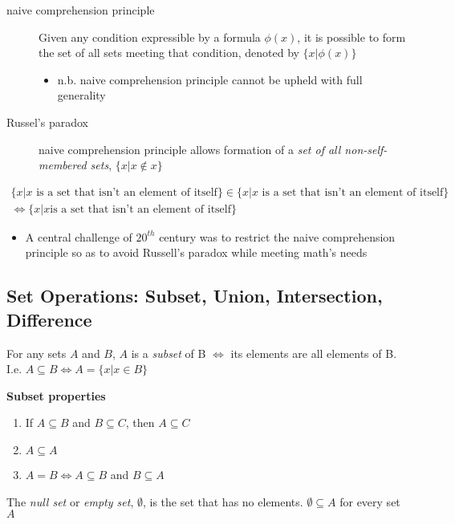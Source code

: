 \begin{description}
	\item[naive comprehension principle] Given any condition expressible by a
		formula $\phi(x)$, it is possible to form the set of all sets meeting
		that condition, denoted by $\{x| \phi(x)\}$
		\begin{itemize}
			\item n.b. naive comprehension principle cannot be upheld with full
			      generality
		\end{itemize}
	\item[Russel's paradox] naive comprehension principle allows formation
		of a \textit{set of all non-self-membered sets}, $\{x| x \not\in x\}$
\end{description}
\begin{align*}
	\{x| x \text{ is a set that isn't an element of itself}\} \in
	\{x| x \text{ is a set that isn't an element of itself}\} \\
	\iff \{x|
	x \text{
		is a set that isn't an element of itself}\}
\end{align*}
\begin{itemize}
	\item A central challenge of $20^{th}$ century was to restrict the naive
	      comprehension principle so as to avoid Russell's paradox while meeting
	      math's needs
\end{itemize}

\subsection{Set Operations: Subset, Union, Intersection, Difference}
\begin{definition}
	For any sets $A$ and $B$, $A$ is a \textit{subset} of B $\iff$ its elements are
	all elements of B. I.e. $A \subseteq B \iff A = \{x | x \in B\}$
\end{definition}
\textbf{Subset properties}
\begin{enumerate}
	\item If $A \subseteq B$ and $B \subseteq C$, then $A \subseteq C$
	\item $A \subseteq A$
	\item $A=B \iff A \subseteq B$ and $B \subseteq A$
\end{enumerate}

\begin{definition}
	The \textit{null set} or \textit{empty set}, $\emptyset$, is the
	set that has no elements. $\emptyset \subseteq A$ for every set $A$
\end{definition}

